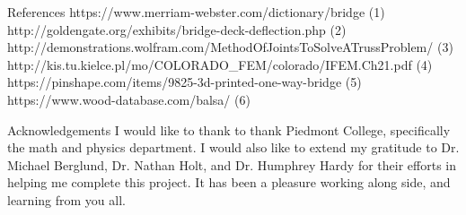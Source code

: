 \documentclass[final]{beamer}
\newlength{\onecolwid}
\begin{document}
\begin{frame}[t]
\begin{columns}[t]
\begin{column}{\onecolwid}
\begin{alertblock}{References}
https://www.merriam-webster.com/dictionary/bridge (1)
http://goldengate.org/exhibits/bridge-deck-deflection.php (2)
http://demonstrations.wolfram.com/MethodOfJointsToSolveATrussProblem/ (3)
http://kis.tu.kielce.pl/mo/COLORADO_FEM/colorado/IFEM.Ch21.pdf (4)
https://pinshape.com/items/9825-3d-printed-one-way-bridge (5)
https://www.wood-database.com/balsa/ (6)

\end{alertblock}

\begin{block}{Acknowledgements}
I would like to thank to thank Piedmont College, specifically the math and physics department. I would also like to extend my gratitude to Dr. Michael Berglund, Dr. Nathan Holt, and Dr. Humphrey Hardy for their efforts in helping me complete this project. It has been a pleasure working along side, and learning from you all.

\end{block}
\end{column}





\end{columns} %

\end{frame} %
\end{document}
